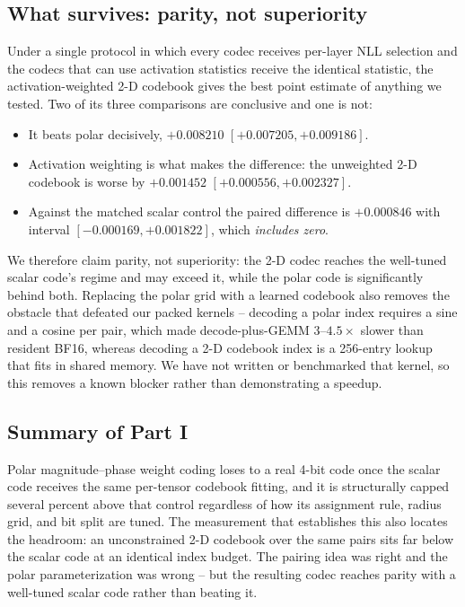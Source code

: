 \subsection{What survives: parity, not superiority}

Under a single protocol in which every codec receives per-layer NLL selection
and the codecs that can use activation statistics receive the identical
statistic, the activation-weighted 2-D codebook gives the best point estimate of
anything we tested. Two of its three comparisons are conclusive and one is not:

\begin{itemize}
\item It beats polar decisively, $+0.008210$ $[+0.007205,+0.009186]$.
\item Activation weighting is what makes the difference: the unweighted 2-D
 codebook is worse by $+0.001452$ $[+0.000556,+0.002327]$.
\item Against the matched scalar control the paired difference is $+0.000846$
 with interval $[-0.000169,+0.001822]$, which \emph{includes zero}.
\end{itemize}

We therefore claim parity, not superiority: the 2-D codec reaches the
well-tuned scalar code's regime and may exceed it, while the polar code is
significantly behind both. Replacing the polar grid with a learned codebook also
removes the obstacle that defeated our packed kernels -- decoding a polar index
requires a sine and a cosine per pair, which made decode-plus-GEMM
$3$--$4.5\times$ slower than resident BF16, whereas decoding a 2-D codebook
index is a 256-entry lookup that fits in shared memory. We have not written or
benchmarked that kernel, so this removes a known blocker rather than
demonstrating a speedup.

\subsection{Summary of Part I}

Polar magnitude--phase weight coding loses to a real 4-bit code once the scalar
code receives the same per-tensor codebook fitting, and it is structurally
capped several percent above that control regardless of how its assignment rule,
radius grid, and bit split are tuned. The measurement that establishes this also
locates the headroom: an unconstrained 2-D codebook over the same pairs sits far
below the scalar code at an identical index budget. The pairing idea was right
and the polar parameterization was wrong -- but the resulting codec reaches
parity with a well-tuned scalar code rather than beating it.
